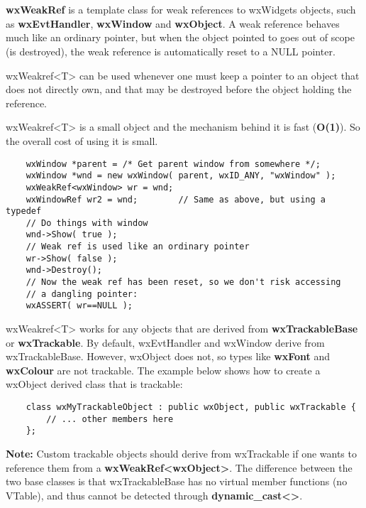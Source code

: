 \section{}\label{wxweakref}

{\bf wxWeakRef} is a template class for weak references to wxWidgets objects, 
such as {\bf wxEvtHandler}, {\bf wxWindow} and {\bf wxObject}. A weak 
reference behaves much like an ordinary pointer, but when the object pointed 
to goes out of scope (is destroyed), the weak reference is automatically 
reset to a NULL pointer. 

wxWeakref<T> can be used whenever one must keep a pointer to an object 
that does not directly own, and that may be destroyed before the object 
holding the reference. 

wxWeakref<T> is a small object and the mechanism behind it is fast 
({\bf O(1)}). So the overall cost of using it is small. 



\begin{verbatim}
    wxWindow *parent = /* Get parent window from somewhere */;
    wxWindow *wnd = new wxWindow( parent, wxID_ANY, "wxWindow" );
    wxWeakRef<wxWindow> wr = wnd;  
    wxWindowRef wr2 = wnd;        // Same as above, but using a typedef
    // Do things with window
    wnd->Show( true );
    // Weak ref is used like an ordinary pointer 
    wr->Show( false );
    wnd->Destroy(); 
    // Now the weak ref has been reset, so we don't risk accessing
    // a dangling pointer:
    wxASSERT( wr==NULL );
\end{verbatim}

wxWeakref<T> works for any objects that are derived from {\bf wxTrackableBase} 
or {\bf wxTrackable}. By default, wxEvtHandler and wxWindow derive from 
wxTrackableBase. However, wxObject does not, so types like {\bf wxFont} and 
{\bf wxColour} are not trackable. The example below shows how to create a 
wxObject derived class that is trackable: 

\begin{verbatim}
    class wxMyTrackableObject : public wxObject, public wxTrackable { 
        // ... other members here 
    }; 
\end{verbatim}

{\bf Note:} Custom trackable objects should derive from wxTrackable 
if one wants to reference them from a {\bf wxWeakRef<wxObject>}. The 
difference between the two base classes is that wxTrackableBase 
has no virtual member functions (no VTable), and thus cannot be detected
through {\bf dynamic_cast<>}.


